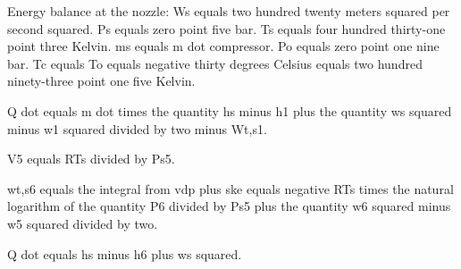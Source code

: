 Energy balance at the nozzle:
Ws equals two hundred twenty meters squared per second squared.
Ps equals zero point five bar.
Ts equals four hundred thirty-one point three Kelvin.
ms equals m dot compressor.
Po equals zero point one nine bar.
Tc equals To equals negative thirty degrees Celsius equals two hundred ninety-three point one five Kelvin.

Q dot equals m dot times the quantity hs minus h1 plus the quantity ws squared minus w1 squared divided by two minus Wt,s1.

V5 equals RTs divided by Ps5.

wt,s6 equals the integral from vdp plus ske equals negative RTs times the natural logarithm of the quantity P6 divided by Ps5 plus the quantity w6 squared minus w5 squared divided by two.

Q dot equals hs minus h6 plus ws squared.